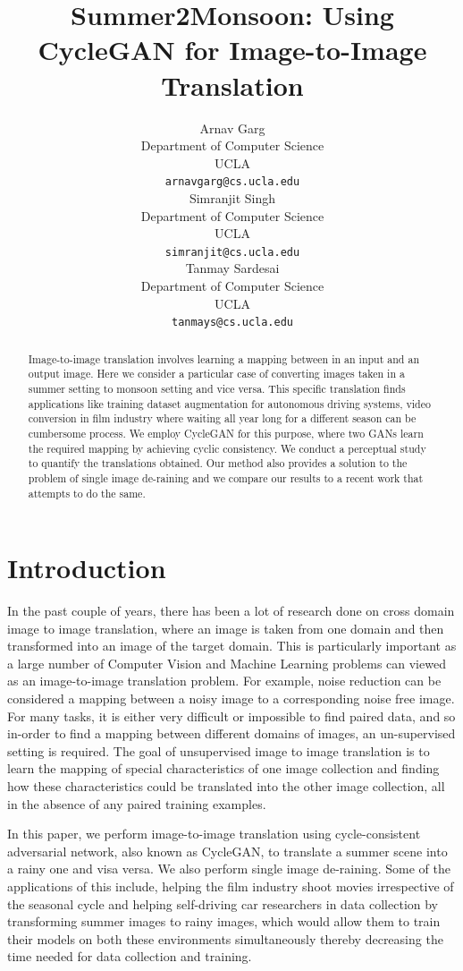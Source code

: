 \documentclass{article}
\title{Summer2Monsoon: Using CycleGAN for Image-to-Image Translation}
\author{
  Arnav Garg \\
  Department of Computer Science\\
  UCLA\\
  \texttt{arnavgarg@cs.ucla.edu} \\
  \And
  Simranjit Singh \\
  Department of Computer Science\\
  UCLA\\
  \texttt{simranjit@cs.ucla.edu} \\
   \And
  Tanmay Sardesai \\
  Department of Computer Science\\
  UCLA\\
  \texttt{tanmays@cs.ucla.edu} \\
}
\begin{document}

\maketitle

\begin{abstract}
 
Image-to-image translation involves learning a mapping between in an input and an output image. Here we consider a particular case of converting images taken in a summer setting to monsoon setting and vice versa. This specific translation finds applications like training dataset augmentation for autonomous driving systems, video conversion in film industry where waiting all year long for a different season can be cumbersome process. We employ CycleGAN for this purpose, where two GANs learn the required mapping by achieving cyclic consistency. We conduct a perceptual study to quantify the translations obtained. Our method also provides a solution to the problem of single image de-raining and we compare our results to a recent work that attempts to do the same.

\end{abstract}

\section{Introduction}

In the past couple of years, there has been a lot of research done on cross domain image to image translation, where an image is taken from one domain and then transformed into an image of the target domain. This is particularly important as a large number of Computer Vision and Machine Learning problems can viewed as an image-to-image translation problem. For example, noise reduction can be considered a mapping between a noisy image to a corresponding noise free image. For many tasks, it is either very difficult or impossible to find paired data, and so in-order to find a mapping between different domains of images, an un-supervised setting is required. The goal of unsupervised image to image translation is to learn the mapping of special characteristics of one image collection and finding how these characteristics could be translated into the other image collection, all in the absence of any paired training examples.

In this paper, we  perform image-to-image translation using cycle-consistent adversarial network, also known as CycleGAN,  to translate a summer scene into a rainy one and visa versa. We also perform single image de-raining. Some of the applications of this include, helping the film industry shoot movies irrespective of the seasonal cycle and helping self-driving car researchers in data collection by transforming summer images to rainy images, which would allow them to train their models on both these environments simultaneously thereby decreasing the time needed for data collection and training.
\end{document}
